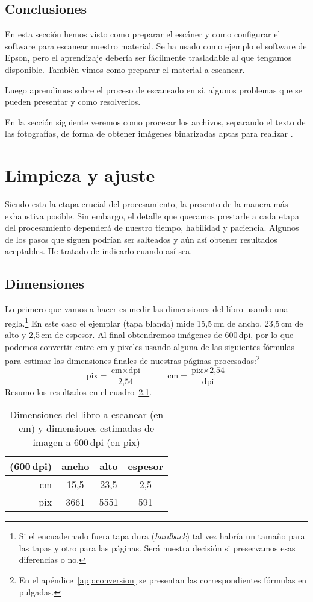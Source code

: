 \documentclass[%
	a5paper,
	10pt,
	twoside,
	openright,
	final,
]{memoir}
\begin{document}
	\section{Conclusiones} En esta sección hemos visto como preparar el escáner y como configurar el software para escanear nuestro material. Se ha usado como ejemplo el software de Epson, pero el aprendizaje debería ser fácilmente trasladable al que tengamos disponible. También vimos como preparar el material a escanear.

	Luego aprendimos sobre el proceso de escaneado en sí, algunos problemas que se pueden presentar y como resolverlos.

	En la sección siguiente veremos como procesar los archivos, separando el texto de las fotografías, de forma de obtener imágenes binarizadas aptas para realizar \ocr.

	\chapter{Limpieza y ajuste\label{sec:cleanAdjust}} Siendo esta la etapa crucial del procesamiento, la presento de la manera más exhaustiva posible. Sin embargo, el detalle que queramos prestarle a cada etapa del procesamiento dependerá de nuestro tiempo, habilidad y paciencia. Algunos de los pasos que siguen podrían ser salteados y aún así obtener resultados aceptables. He tratado de indicarlo cuando así sea.

	\section{Dimensiones\label{sec:cleanAdjustDimensions}} Lo primero que vamos a hacer es medir las dimensiones del libro usando una regla.\footnote{Si el encuadernado fuera tapa dura (\emph{hardback}) tal vez habría un tamaño para las tapas y otro para las páginas. Será nuestra decisión si preservamos esas diferencias o no.} En este caso el ejemplar (tapa blanda) mide 15,5\,cm de ancho, 23,5\,cm de alto y 2,5\,cm de espesor. Al final obtendremos imágenes de 600\,dpi, por lo que podemos convertir entre cm y pixeles usando alguna de las siguientes fórmulas para estimar las dimensiones finales de nuestras páginas procesadas:\footnote{En el apéndice~\ref{app:conversion} se presentan las correspondientes fórmulas en pulgadas.}
	\[
	\text{pix} = \frac{\text{cm} \times \text{dpi}}{\text{2,54}}\hspace{3em} \text{cm} = \frac{\text{pix} \times \text{2,54}}{\text{dpi}}
	\]
	Resumo los resultados en el cuadro~\ref{tab:bookDimensions}.
	\begin{table}
		\centering
		\begin{tabular}{rccc}
			\toprule
			(600\,dpi) & ancho & alto & espesor \\
			\midrule
			cm  & 15,5 & 23,5 & 2,5 \\
			pix & 3661 & 5551 & 591 \\
			\bottomrule
		\end{tabular}
		\caption{Dimensiones del libro a escanear (en cm) y dimensiones estimadas de imagen a 600\,dpi (en pix)\label{tab:bookDimensions}}
	\end{table}
\end{document}
